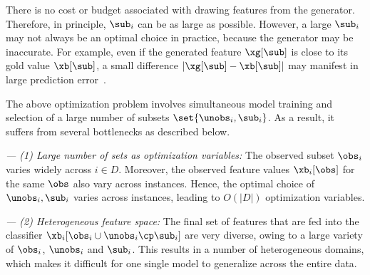 \documentclass[letterpaper]{article}
\renewcommand{\cite}{\citep}
\begin{document}
%
There is no cost or budget associated with drawing features from the generator. Therefore, in principle, $\sub_i$ can be as large as possible. However, a large $\sub_i$ may not always be an optimal choice in practice, because the generator may be inaccurate. For example, even if the generated feature $\xg[\sub]$ is close to its gold value $\xb[\sub]$, a small  difference $|\xg[\sub]-\xb[\sub]|$ may manifest in large prediction error~\cite{szegedy2013intriguing,goodfellow2014explaining}. 







The above optimization problem involves simultaneous model training and selection of a large number of subsets  $\set{\unobs_i,\sub_i}$. As a result, it suffers from several bottlenecks as described below. 

\noindent\emph{--- (1) Large number of sets as optimization variables:} The observed subset $\obs_i$ varies widely across $i\in D$. Moreover,  the observed feature values $\xb_i[\obs]$ for the same $\obs$ also vary across instances. Hence, the optimal choice of $\unobs_i,\sub_i$ varies across instances, leading to $O(|D|)$ optimization variables. 

\noindent\emph{--- (2) Heterogeneous feature space:}
The final set of features that are fed into the classifier $\xb_i[\obs_i \cup \unobs_i\cp \sub_i]$ are very diverse, owing to a large variety of $\obs_i$, $\unobs_i$ and $\sub_i$. This results in a number of heterogeneous domains, which makes it difficult for one single model   to generalize across the entire data.
\end{document}
